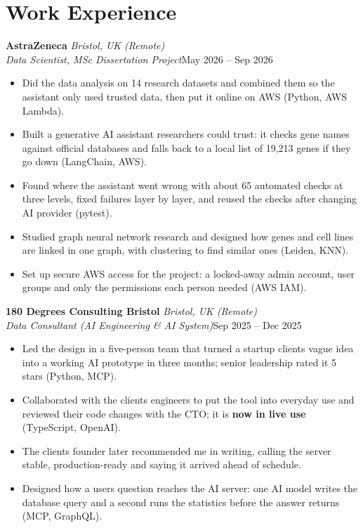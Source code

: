 \documentclass[a4paper,11pt]{article}
\newcommand{\role}[4]{%
  \textbf{#1}{\color{muted}\,\textperiodcentered\,\textit{#2}}\\
  \textit{#4}\hfill{\color{muted}#3}\par}
\newcommand{\gap}{\vspace{5pt}}
\newcommand{\num}[1]{\textbf{#1}}   %
\begin{document}
\section{Work Experience}
\role{AstraZeneca}{Bristol, UK (Remote)}{May 2026 – Sep 2026}{Data Scientist, MSc Dissertation Project}
\begin{itemize}
  \item Did the data analysis on 14 research datasets and combined them so the assistant only used trusted data, then put it online on AWS (Python, AWS Lambda).
  \item Built a generative AI assistant researchers could trust: it checks gene names against official databases and falls back to a local list of 19,213 genes if they go down (LangChain, AWS).
  \item Found where the assistant went wrong with about 65 automated checks at three levels, fixed failures layer by layer, and reused the checks after changing AI provider (pytest).
  \item Studied graph neural network research and designed how genes and cell lines are linked in one graph, with clustering to find similar ones (Leiden, KNN).
  \item Set up secure AWS access for the project: a locked-away admin account, user groups and only the permissions each person needed (AWS IAM).
\end{itemize}
\gap
{}
\role{180 Degrees Consulting Bristol}{Bristol, UK (Remote)}{Sep 2025 – Dec 2025}{Data Consultant (AI Engineering \& AI System)}
\begin{itemize}
  \item Led the design in a five-person team that turned a startup client\textquotesingle{}s vague idea into a working AI prototype in three months; senior leadership rated it 5 stars (Python, MCP).
  \item Collaborated with the client\textquotesingle{}s engineers to put the tool into everyday use and reviewed their code changes with the CTO; it is \num{now in live use} (TypeScript, OpenAI).
  \item The client\textquotesingle{}s founder later recommended me in writing, calling the server \textquotesingle{}stable, production-ready\textquotesingle{} and saying it arrived ahead of schedule.
  \item Designed how a user\textquotesingle{}s question reaches the AI server: one AI model writes the database query and a second runs the statistics before the answer returns (MCP, GraphQL).
\end{itemize}
\end{document}

